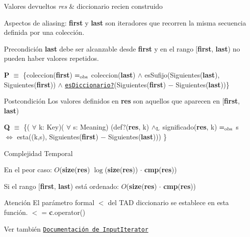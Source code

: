 \begin{DoxyRetVals}{Valores devueltos}
{\em res} & diccionario recien construido\\
\hline
\end{DoxyRetVals}
\begin{DoxyParagraph}{Aspectos de aliasing\+:}
{\bfseries first} y {\bfseries last} son iteradores que recorren la misma secuencia definida por una colección.
\end{DoxyParagraph}
\begin{DoxyPrecond}{Precondición}
{\bfseries last} debe ser alcanzable desde {\bfseries first} y en el rango \mbox{[}{\bfseries first}, {\bfseries last}) no pueden haber valores repetidos.

{\bfseries P} $\equiv$ \{coleccion({\bfseries first}) $=_{\rm obs}$ coleccion({\bfseries last}) $\land$ es\+Sufijo(Siguientes({\bfseries last}), Siguientes({\bfseries first})) $\land$ \href{axiomas.html#esDiccionario?}{\tt es\+Diccionario?}(Siguientes({\bfseries first}) $-$ Siguientes({\bfseries last}))\} 
\end{DoxyPrecond}


\begin{DoxyPostcond}{Postcondición}
Los valores definidos en {\bfseries res} son aquellos que aparecen en \mbox{[}{\bfseries first}, {\bfseries last})

{\bfseries Q} $\equiv$ \{( $\forall$ k\+: Key)( $\forall$ s\+: Meaning) (def?({\bfseries res}, k) $\land_{\rm L}$ significado({\bfseries res}, k) $=_{\rm obs}$ s $\Leftrightarrow$ esta((k,s), Siguientes({\bfseries first}) $-$ Siguientes({\bfseries last}))) \} 
\end{DoxyPostcond}



\begin{DoxyDescription}
\item[Complejidad Temporal]
\begin{DoxyItemize}
\item En el peor caso\+: $O$({\bfseries size}({\bfseries res}) $\log$({\bfseries size}({\bfseries res})) $\cdot$ {\bfseries cmp}({\bfseries res}))
\item Si el rango \mbox{[}{\bfseries first}, {\bfseries last}) está ordenado\+: $O$({\bfseries size}({\bfseries res}) $\cdot$ {\bfseries cmp}({\bfseries res})) 
\end{DoxyItemize}
\end{DoxyDescription}

\begin{DoxyAttention}{Atención}
El parámetro formal $<$ del T\+AD diccionario se establece en esta función. $<$ = {\bfseries c}.operator()
\end{DoxyAttention}
\begin{DoxySeeAlso}{Ver también}
\href{http://en.cppreference.com/w/cpp/concept/InputIterator}{\tt Documentación de Input\+Iterator} 
\end{DoxySeeAlso}


